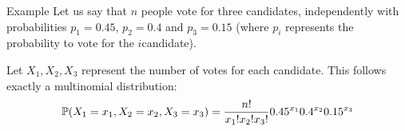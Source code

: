 \documentclass[a4paper]{article}
\begin{document}
\begin{parag}{Example}
    Let us say that $n$ people vote for three candidates, independently with probabilities $p_1 = 0.45$, $p_2 = 0.4$ and $p_3 = 0.15$ (where $p_i$ represents the probability to vote for the $i$\Th candidate). 

    Let $X_1, X_2, X_3$ represent the number of votes for each candidate. This follows exactly a multinomial distribution:
    \[\prob\left(X_1 = x_1, X_2 = x_2, X_3 = x_3\right) = \frac{n!}{x_1!x_2!x_3!} 0.45^{x_1} 0.4^{x_2} 0.15^{x_3}\]
\end{parag}
\end{document}
